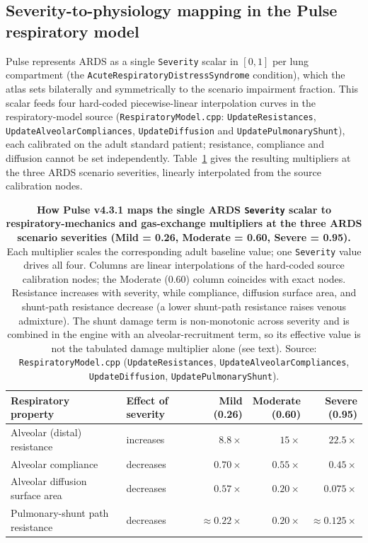 \documentclass[pdflatex,sn-nature]{sn-jnl}%
\begin{document}
\subsection{Severity-to-physiology mapping in the Pulse respiratory model}\label{sec:s5-mapping}

Pulse represents ARDS as a single \texttt{Severity} scalar in $[0, 1]$ per lung compartment (the \texttt{AcuteRespiratoryDistressSyndrome} condition), which the atlas sets bilaterally and symmetrically to the scenario impairment fraction. This scalar feeds four hard-coded piecewise-linear interpolation curves in the respiratory-model source (\texttt{RespiratoryModel.cpp}: \texttt{UpdateResistances}, \texttt{UpdateAlveolarCompliances}, \texttt{UpdateDiffusion} and \texttt{UpdatePulmonaryShunt}), each calibrated on the adult standard patient; resistance, compliance and diffusion cannot be set independently. Table~\ref{tab:s5-mapping} gives the resulting multipliers at the three ARDS scenario severities, linearly interpolated from the source calibration nodes.

\begin{table}[htbp]
\centering
\caption{\textbf{How Pulse v4.3.1 maps the single ARDS \texttt{Severity} scalar to respiratory-mechanics and gas-exchange multipliers at the three ARDS scenario severities (Mild = 0.26, Moderate = 0.60, Severe = 0.95).} Each multiplier scales the corresponding adult baseline value; one \texttt{Severity} value drives all four. Columns are linear interpolations of the hard-coded source calibration nodes; the Moderate (0.60) column coincides with exact nodes. Resistance increases with severity, while compliance, diffusion surface area, and shunt-path resistance decrease (a lower shunt-path resistance raises venous admixture). The shunt damage term is non-monotonic across severity and is combined in the engine with an alveolar-recruitment term, so its effective value is not the tabulated damage multiplier alone (see text). Source: \texttt{RespiratoryModel.cpp} (\texttt{UpdateResistances}, \texttt{UpdateAlveolarCompliances}, \texttt{UpdateDiffusion}, \texttt{UpdatePulmonaryShunt}).}
\label{tab:s5-mapping}
\begin{tabular}{llrrr}
\toprule
Respiratory property & Effect of severity & \shortstack[r]{Mild\\(0.26)} & \shortstack[r]{Moderate\\(0.60)} & \shortstack[r]{Severe\\(0.95)} \\
\midrule
Alveolar (distal) resistance      & increases & $8.8\times$  & $15\times$   & $22.5\times$  \\
Alveolar compliance               & decreases & $0.70\times$ & $0.55\times$ & $0.45\times$  \\
Alveolar diffusion surface area   & decreases & $0.57\times$ & $0.20\times$ & $0.075\times$ \\
Pulmonary-shunt path resistance   & decreases & $\approx 0.22\times$ & $0.20\times$ & $\approx 0.125\times$ \\
\bottomrule
\end{tabular}
\end{table}
\end{document}
